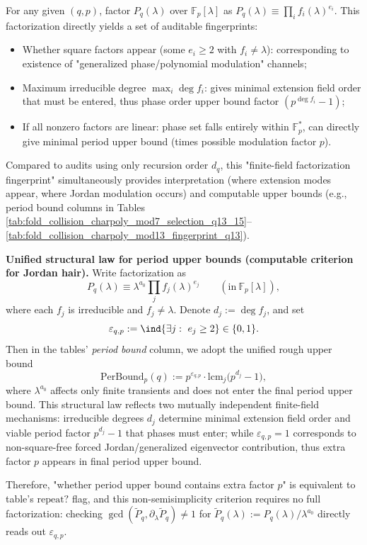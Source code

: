 \begin{remark}\label{rem:pom-charpoly-modp-audit-method}
For any given \((q,p)\), factor \(P_q(\lambda)\) over \(\mathbb{F}_p[\lambda]\) as
\(
P_q(\lambda)\equiv \prod_i f_i(\lambda)^{e_i}
\).
This factorization directly yields a set of auditable fingerprints:
\begin{itemize}
  \item Whether square factors appear (some \(e_i\ge 2\) with \(f_i\neq \lambda\)): corresponding to existence of "generalized phase/polynomial modulation" channels;
  \item Maximum irreducible degree \(\max_i \deg f_i\): gives minimal extension field order that must be entered, thus phase order upper bound factor \((p^{\deg f_i}-1)\);
  \item If all nonzero factors are linear: phase set falls entirely within \(\mathbb{F}_p^\ast\), can directly give minimal period upper bound (times possible modulation factor \(p\)).
\end{itemize}
Compared to audits using only recursion order \(d_q\), this "finite-field factorization fingerprint" simultaneously provides interpretation (where extension modes appear, where Jordan modulation occurs) and computable upper bounds (e.g., period bound columns in Tables \ref{tab:fold_collision_charpoly_mod7_selection_q13_15}--\ref{tab:fold_collision_charpoly_mod13_fingerprint_q13}).
\par
\textbf{Unified structural law for period upper bounds (computable criterion for Jordan hair).}
Write factorization as
\[
P_q(\lambda)\equiv \lambda^{a_0}\prod_{j} f_j(\lambda)^{e_j}\qquad(\mathrm{in}\ \mathbb{F}_p[\lambda]),
\]
where each \(f_j\) is irreducible and \(f_j\neq \lambda\).
Denote \(d_j:=\deg f_j\), and set
\[
\varepsilon_{q,p}:=\ind\{\exists j:\ e_j\ge 2\}\in\{0,1\}.
\]
Then in the tables' \emph{period bound} column, we adopt the unified rough upper bound
\[
\mathrm{PerBound}_p(q):=
p^{\varepsilon_{q,p}}\cdot \mathrm{lcm}_{j}\bigl(p^{d_j}-1\bigr),
\]
where \(\lambda^{a_0}\) affects only finite transients and does not enter the final period upper bound.
This structural law reflects two mutually independent finite-field mechanisms: irreducible degrees \(d_j\) determine minimal extension field order and viable period factor \(p^{d_j}-1\) that phases must enter; while \(\varepsilon_{q,p}=1\) corresponds to non-square-free forced Jordan/generalized eigenvector contribution, thus extra factor \(p\) appears in final period upper bound.
\par
Therefore, "whether period upper bound contains extra factor \(p\)" is equivalent to table's \(\mathrm{repeat?}\) flag, and this non-semisimplicity criterion requires no full factorization: checking
\(\gcd(\widetilde P_q,\partial_\lambda\widetilde P_q)\neq 1\) for \(\widetilde P_q(\lambda):=P_q(\lambda)/\lambda^{a_0}\) directly reads out \(\varepsilon_{q,p}\).
\end{remark}

